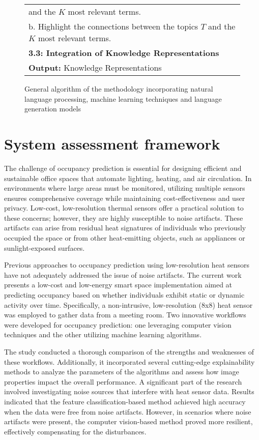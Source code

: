 \documentclass[runningheads]{llncs}
\begin{document}
\begin{figure*}[!h]
\begin{tabular}{l}
		\quad \quad and the $K$ most relevant terms.\\
		\quad \quad b. Highlight the connections between the topics $T$ and the $K$ most relevant terms.\\
		\quad \textbf{3.3: Integration of Knowledge Representations}\\
		\hline
		\textbf{Output:} Knowledge Representations \\
		\hline
	\end{tabular}
	\caption{\centering General algorithm of the methodology incorporating natural language processing, machine learning techniques and language generation models}
	\label{tab:Algorithm}
\end{figure*}


\section{System assessment framework}
The challenge of occupancy prediction is essential for designing efficient and sustainable office spaces that automate lighting, heating, and air circulation. In environments where large areas must be monitored, utilizing multiple sensors ensures comprehensive coverage while maintaining cost-effectiveness and user privacy. Low-cost, low-resolution thermal sensors offer a practical solution to these concerns; however, they are highly susceptible to noise artifacts. These artifacts can arise from residual heat signatures of individuals who previously occupied the space or from other heat-emitting objects, such as appliances or sunlight-exposed surfaces.

Previous approaches to occupancy prediction using low-resolution heat sensors have not adequately addressed the issue of noise artifacts. The current work presents a low-cost and low-energy smart space implementation aimed at predicting occupancy based on whether individuals exhibit static or dynamic activity over time. Specifically, a non-intrusive, low-resolution (8x8) heat sensor was employed to gather data from a meeting room. Two innovative workflows were developed for occupancy prediction: one leveraging computer vision techniques and the other utilizing machine learning algorithms.

The study conducted a thorough comparison of the strengths and weaknesses of these workflows. Additionally, it incorporated several cutting-edge explainability methods to analyze the parameters of the algorithms and assess how image properties impact the overall performance. A significant part of the research involved investigating noise sources that interfere with heat sensor data. Results indicated that the feature classification-based method achieved high accuracy when the data were free from noise artifacts. However, in scenarios where noise artifacts were present, the computer vision-based method proved more resilient, effectively compensating for the disturbances.
\end{document}
